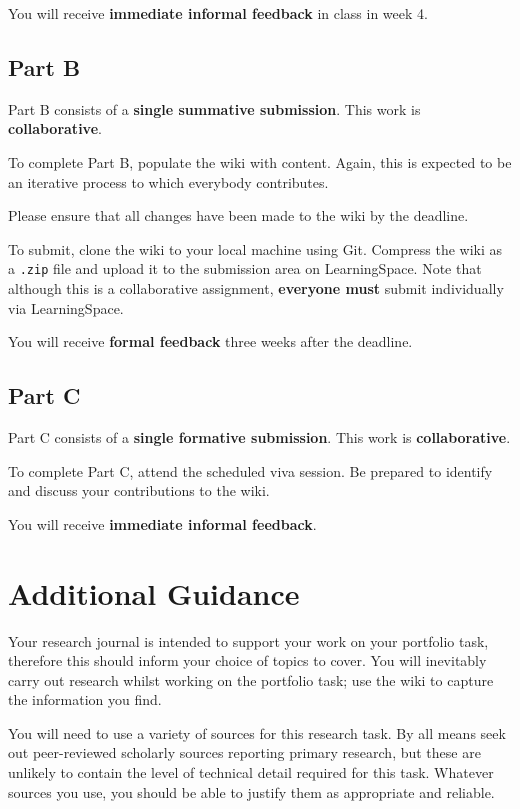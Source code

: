 \documentclass{../../fal_assignment}
\begin{document}
You will receive \textbf{immediate informal feedback} in class in week 4.

\subsection*{Part B}

Part B consists of a \textbf{single summative submission}. This work is \textbf{collaborative}.

To complete Part B, populate the wiki with content.
Again, this is expected to be an iterative process to which everybody contributes.

Please ensure that all changes have been made to the wiki by the deadline.

To submit, clone the wiki to your local machine using Git.
Compress the wiki as a \texttt{.zip} file and upload it to the submission area on LearningSpace.
Note that although this is a collaborative assignment,
\textbf{everyone must} submit individually via LearningSpace.

You will receive \textbf{formal feedback} three weeks after the deadline.

\subsection*{Part C}

Part C consists of a \textbf{single formative submission}. This work is \textbf{collaborative}.

To complete Part C, attend the scheduled viva session.
Be prepared to identify and discuss your contributions to the wiki.

You will receive \textbf{immediate informal feedback}.

\section*{Additional Guidance}

Your research journal is intended to support your work on your portfolio task,
therefore this should inform your choice of topics to cover.
You will inevitably carry out research whilst working on the portfolio task;
use the wiki to capture the information you find.

You will need to use a variety of sources for this research task.
By all means seek out peer-reviewed scholarly sources reporting primary research,
but these are unlikely to contain the level of technical detail required for this task.
Whatever sources you use, you should be able to justify them as appropriate and reliable.
\end{document}
